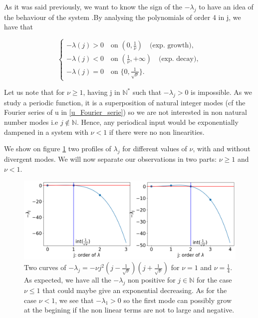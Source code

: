 \documentclass[12pt]{article}
\begin{document}
As it was said previously, we want to know the sign of the $-\lambda_j$ to have an idea of the behaviour of the system .By analysing the polynomials of order 4 in j, we have that

\begin{equation}
\left\{
\begin{aligned}
    -\lambda(j) > 0 \quad  \text{on } (0, \frac{1}{\nu}) \quad \text{(exp. growth)},\\
    -\lambda(j) < 0 \quad  \text{on } (\frac{1}{\nu}, +\infty)  \quad \text{(exp. decay)},\\
    -\lambda(j) = 0 \quad \text{on } \{0, \frac{1}{\sqrt{\nu}}\}.
\end{aligned}
\right.
\end{equation}

Let us note that for $\nu \geq 1$, having j in $\mathbb{N}^*$ such that $-\lambda_j > 0$ is impossible. As we study a periodic function,
 it is a superposition of natural integer modes (cf the Fourier series of u in \eqref{u_Fourier_serie}) so we are not interested in non natural number modes i.e $j \notin \mathbb{N}$. Hence, any periodical input would 
 be exponentially dampened in a system with $\nu <1 $ if there were no non linearities. 

We show on figure \ref{fig:KS_eq_lambda_growing_and_dampening} two profiles of $\lambda_j$ for different values of $\nu$, with and without
divergent modes. We will now separate our observations in two parts: $\nu \geq1$ and $\nu <1$.
\\

\begin{figure}[h]
\includegraphics[width=1\textwidth]{KS_eq/plot_dispersion_nu_1_1-4.png}
\caption{Two curves of $-\lambda_j = -\nu j^2(j-\frac{1}{\sqrt{\nu}})(j+\frac{1}{\sqrt{\nu}})$ for $\nu=1$ and $\nu=\frac{1}{4}$. 
As expected, we have all the $-\lambda_j$ non positive for $j \in \mathbb{N}$ for the case $\nu \leq 1$ that could maybe give
an exponential decreasing. As for the case $\nu < 1$, we see that $-\lambda_1 >0$ so the first mode can possibly grow at the begining if the 
 non linear terms are not to large and negative.} 
\label{fig:KS_eq_lambda_growing_and_dampening}
\end{figure}
\end{document}
